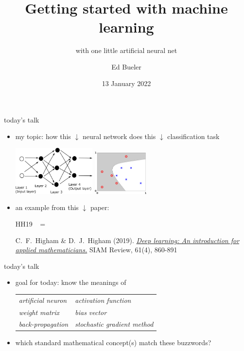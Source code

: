 \documentclass[xcolor={svgnames},
               hyperref={colorlinks,citecolor=DeepPink4,linkcolor=FireBrick,urlcolor=Maroon}]
               {beamer}
\title{Getting started with machine learning}
\subtitle{{with one little artificial neural net}}
\author{Ed Bueler}
\institute[UAF]{MATH 692 Mathematics for Machine Learning \\ UAF}
\date[Spring 2022]{13 January 2022}
\begin{document}
\beamertemplatenavigationsymbolsempty

\begin{frame}
  \maketitle
\end{frame}

\begin{frame}{today's talk}

\begin{itemize}
\item \alert{my topic:} {\small how this $\downarrow$ neural network does this $\downarrow$ classification task}

\medskip
\hspace{5mm} \includegraphics[height=25mm]{figs/network.png} \hfill \includegraphics[height=23mm]{figs/classification} \hspace{10mm}

\medskip
\item an \alert{example} from this $\downarrow$ paper:

\medskip

HH19 \, $=$ \, 
\begin{minipage}[t]{0.75\textwidth} \footnotesize
C.~F.~Higham \& D.~J.~Higham (2019). \href{http://www.math.stonybrook.edu/~bishop/classes/math533.S21/MachineLearning/SIAMreview.pdf}{\emph{Deep learning: An introduction for applied mathematicians.}} SIAM Review, 61(4), 860-891
\end{minipage}
\end{itemize}
\end{frame}


\begin{frame}{today's talk}

\begin{itemize}
\item \alert{goal for today:} know the meanings of

\medskip
\small
\qquad \begin{tabular}{ll}
\emph{artificial neuron} \qquad & \emph{activation function} \\
\emph{weight matrix} & \emph{bias vector} \\
\emph{back-propagation} & \emph{stochastic gradient method}
\end{tabular}

\medskip
\item which standard mathematical concept(s) match these buzzwords?
\end{itemize}
\end{frame}
\end{document}

